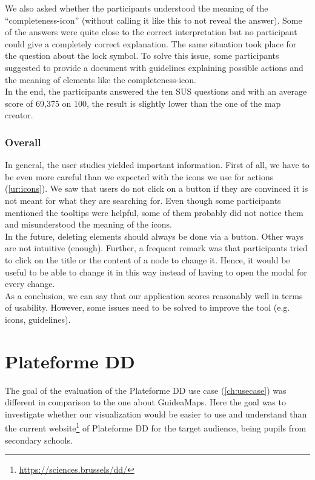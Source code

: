 We also asked whether the participants understood the meaning of the ``completeness-icon'' (without calling it like this to not reveal the answer). Some of the answers were quite close to the correct interpretation but no participant could give a completely correct explanation. The same situation took place for the question about the lock symbol. To solve this issue, some participants suggested to provide a document with guidelines explaining possible actions and the meaning of elements like the completeness-icon.\\

In the end, the participants answered the ten SUS questions and with an average score of 69,375 on 100, the result is slightly lower than the one of the map creator.

\subsubsection{Overall}
In general, the user studies yielded important information. First of all, we have to be even more careful than we expected with the icons we use for actions (\ref{ur:icons}). We saw that users do not click on a button if they are convinced it is not meant for what they are searching for. Even though some participants mentioned the tooltips were helpful, some of them probably did not notice them and misunderstood the meaning of the icons.\\

In the future, deleting elements should always be done via a button. Other ways are not intuitive (enough). Further, a frequent remark was that participants tried to click on the title or the content of a node to change it. Hence, it would be useful to be able to change it in this way instead of having to open the modal for every change.\\

As a conclusion, we can say that our application scores reasonably well in terms of usability. However, some issues need to be solved to improve the tool (e.g. icons, guidelines).




\section{Plateforme DD}
The goal of the evaluation of the Plateforme DD use case (\autoref{ch:usecase}) was different in comparison to the one about GuideaMaps. Here the goal was to investigate whether our visualization would be easier to use and understand than the current website\footnote{\url{https://sciences.brussels/dd/}} of Plateforme DD for the target audience, being pupils from secondary schools.\\

